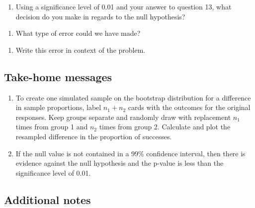 \documentclass[
]{report}
\providecommand{\tightlist}{%
  \setlength{\itemsep}{0pt}\setlength{\parskip}{0pt}}
\begin{document}
\begin{enumerate}
\def\labelenumi{\arabic{enumi}.}
\setcounter{enumi}{13}
\tightlist
\item
  Using a significance level of 0.01 and your answer to question 13, what decision do you make in regards to the null hypothesis?
\end{enumerate}

\vspace{0.3in}

\begin{enumerate}
\def\labelenumi{\arabic{enumi}.}
\setcounter{enumi}{14}
\tightlist
\item
  What type of error could we have made?
\end{enumerate}

\vspace{0.3in}

\begin{enumerate}
\def\labelenumi{\arabic{enumi}.}
\setcounter{enumi}{15}
\tightlist
\item
  Write this error in context of the problem.
\end{enumerate}

\vspace{0.5in}

\hypertarget{take-home-messages-12}{%
\subsection{Take-home messages}\label{take-home-messages-12}}

\begin{enumerate}
\def\labelenumi{\arabic{enumi}.}
\item
  To create one simulated sample on the bootstrap distribution for a difference in sample proportions, label \(n_1 + n_2\) cards with the outcomes for the original responses. Keep groups separate and randomly draw with replacement \(n_1\) times from group 1 and \(n_2\) times from group 2. Calculate and plot the resampled difference in the proportion of successes.
\item
  If the null value is not contained in a 99\% confidence interval, then there is evidence against the null hypothesis and the p-value is less than the significance level of 0.01.
\end{enumerate}

\hypertarget{additional-notes-12}{%
\subsection{Additional notes}\label{additional-notes-12}}
\end{document}
